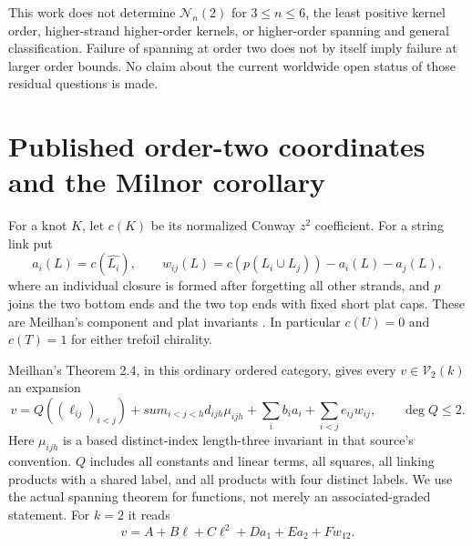 \documentclass[11pt]{article}
\theoremstyle{remark}\newtheorem{remark}[theorem]{Remark}
\newcommand{\V}{\mathcal V}
\newcommand{\N}{\mathcal N}
\begin{document}
This work does not determine $\N_n(2)$ for $3\leq n\leq6$, the least
positive kernel order, higher-strand higher-order kernels, or higher-order
spanning and general classification. Failure of spanning at order two
does not by itself imply failure at larger order bounds. No claim about
the current worldwide open status of those residual questions is made.

\section{Published order-two coordinates and the Milnor corollary}
For a knot $K$, let $c(K)$ be its normalized Conway $z^2$ coefficient.
For a string link put
\[
a_i(L)=c(\widehat{L_i}),\qquad
w_{ij}(L)=c(p(L_i\cup L_j))-a_i(L)-a_j(L),
\]
where an individual closure is formed after forgetting all other strands,
and $p$ joins the two bottom ends and the two top ends with fixed short
plat caps. These are Meilhan's component and plat invariants
\cite[\S2.1 and Proposition 2.1]{Meilhan}. In particular
$c(U)=0$ and $c(T)=1$ for either trefoil chirality.

Meilhan's Theorem 2.4, in this ordinary ordered category, gives every
$v\in\V_2(k)$ an expansion
\begin{equation}\label{eq:classification}
v=Q((\ell_{ij})_{i<j})+sum_{i<j<h}d_{ijh}\mu_{ijh}
   +\sum_i b_i a_i+\sum_{i<j}e_{ij}w_{ij},\qquad \deg Q\leq2.
\end{equation}
Here $\mu_{ijh}$ is a based distinct-index length-three invariant in that
source's convention. $Q$ includes all constants and linear terms, all
squares, all linking products with a shared label, and all products with
four distinct labels. We use the actual spanning theorem for functions,
not merely an associated-graded statement. For $k=2$ it reads
\begin{equation}\label{eq:six}
v=A+B\ell+C\ell^2+D a_1+E a_2+F w_{12}.
\end{equation}
\end{document}

